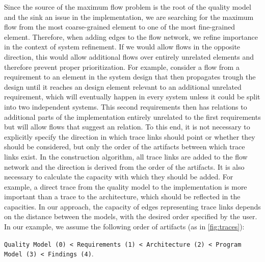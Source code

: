 Since the source of the maximum flow problem is the root of the quality model and the sink an issue in the implementation, we are searching for the maximum flow from the most coarse-grained element to one of the most fine-grained element.
Therefore, when adding edges to the flow network, we refine importance in the context of system refinement.
If we would allow flows in the opposite direction, this would allow additional flows over entirely unrelated elements and therefore prevent proper prioritization.
For example, consider a flow from a requirement to an element in the system design that then propagates trough the design until it reaches an design element relevant to an additional unrelated requirement, which will eventually happen in every system unless it could be split into two independent systems.
This second requirements then has relations to additional parts of the implementation entirely unrelated to the first requirements but will allow flows that suggest an relation.
To this end, it is not necessary to explicitly specify the direction in which trace links should point or whether they should be considered, but only the order of the artifacts between which trace links exist.
In the construction algorithm, all trace links are added to the flow network and the direction is derived from the order of the artifacts.
It is also necessary to calculate the capacity with which they should be added.
For example, a direct trace from the quality model to the implementation is more important than a trace to the architecture, which should be reflected in the capacities.
In our approach, the capacity of edges representing trace links depends on the distance between the models, with the desired order specified by the user.
In our example, we assume the following order of artifacts (as in \autoref{fig:traces}):

\begin{small}
\begin{description}
\item \texttt{Quality Model (0) < Requirements (1) < Archi\-tec\-ture~(2) < Program Model~(3) < Findings~(4)}.
\end{description}
\end{small}

